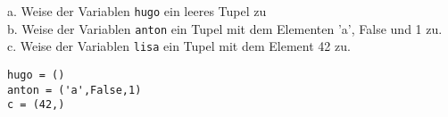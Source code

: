 \question[3]
a. Weise der Variablen \texttt{hugo} ein leeres Tupel zu \\
b. Weise der Variablen \texttt{anton} ein Tupel mit dem Elementen 'a', False und 1 zu. \\
c. Weise der Variablen \texttt{lisa} ein Tupel mit dem Element 42 zu.
\begin{solutionbox}{2cm}
\begin{lstlisting}
hugo = ()
anton = ('a',False,1)
c = (42,)
\end{lstlisting}
\end{solutionbox}
